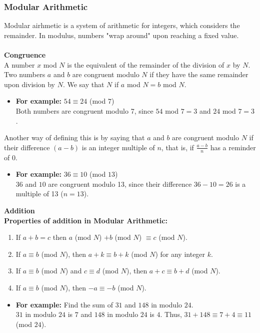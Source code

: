 \subsubsection{Modular Arithmetic}
\begin{justify}
Modular airhmetic is a system of arithmetic for integers, which considers the remainder.
In modulus, numbers "wrap around" upon reaching a fixed value.\\ \\
\textbf{Congruence}\\
A number $x$ mod $N$ is the equivalent of the remainder of the division of $x$ by $N$.
Two numbers $a$ and $b$ are congruent modulo $N$ if they have the same remainder
upon division by $N$. We say that $N$ if $a$ mod $N = b$ mod $N$.
\begin{itemize}
\item \textbf{For example:} $54 \equiv 24$ (mod $7$)\\Both numbers are congruent modulo 7, 
since $54$ mod $7 = 3$ and $24$ mod $7 = 3$.
\end{itemize}
Another way of defining this is by saying that $a$ and $b$ are congruent modulo $N$ if their 
difference $(a-b)$ is an integer multiple of $n$, that is, if $\frac{a - b}{n}$ has a reminder of 0.
\begin{itemize}
\item \textbf{For example:} $36 \equiv 10$ (mod $13$)\\$36$ and $10$ are congruent modulo 13, since
their difference $36-10 = 26$ is a multiple of 13 ($n = 13$).
\end{itemize}
\textbf{Addition}\\
\textbf{Properties of addition in Modular Arithmetic:}
\begin{enumerate}
\item If $a + b = c$ then $a$ (mod $N$) $+ b$ (mod $N$) $\equiv c$ (mod $N$).
\item If $a \equiv b$ (mod $N$), then $a + k \equiv b + k$ (mod $N$) for any integer $k$.
\item If $a \equiv b$ (mod $N$) and $c \equiv d$ (mod $N$), then $a + c \equiv b + d$ (mod $N$).
\item If $a \equiv b$ (mod $N$), then $-a \equiv -b$ (mod $N$).
\end{enumerate}
\begin{itemize}
\item \textbf{For example:} Find the sum of $31$ and $148$ in modulo $24$.\\
$31$ in modulo $24$ is $7$ and $148$ in modulo $24$ is $4$. Thus, $31 + 148 \equiv 7 + 4 \equiv 11$ (mod $24$).

\end{itemize}
\end{justify}
